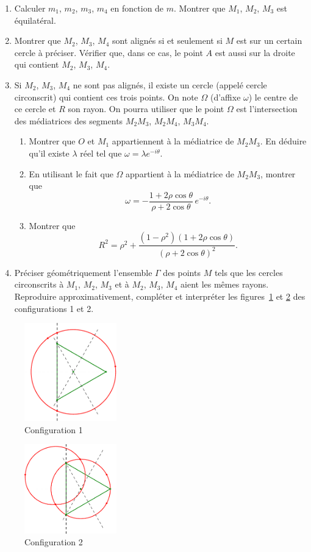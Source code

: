 \begin{enumerate}
 \item Calculer $m_1$, $m_2$, $m_3$, $m_4$ en fonction de $m$. Montrer que $M_1$, $M_2$, $M_3$ est équilatéral.
 \item Montrer que $M_2$, $M_3$, $M_4$ sont alignés si et seulement si $M$ est sur un certain cercle à préciser. Vérifier que, dans ce cas, le point $A$ est aussi sur la droite qui contient $M_2$, $M_3$, $M_4$.
 \item Si $M_2$, $M_3$, $M_4$ ne sont pas alignés, il existe un cercle (appelé cercle circonscrit) qui contient ces trois points.  On note $\Omega$ (d'affixe $\omega$) le centre de ce cercle et $R$ son rayon. On pourra utiliser que le point $\Omega$ est l'intersection des médiatrices des segments $M_2 M_3$, $M_2 M_4$, $M_3 M_4$.
    \begin{enumerate}
     \item Montrer que $O$ et $M_1$ appartiennent à la médiatrice de $M_2 M_3$. En déduire qu'il existe $\lambda$ réel tel que $\omega = \lambda e^{-i \theta}$.
     \item En utilisant le fait que $\Omega$ appartient à la médiatrice de $M_2 M_3$, montrer que
 \[
 \omega = - \frac{1+2\rho \cos \theta}{\rho +2 \cos \theta} \, e^{-i \theta}.
 \]
     \item Montrer que 
\[
  R^2= \rho^2 +\frac{(1-\rho^2)(1+2\rho \cos \theta)}{(\rho + 2 \cos \theta)^2}.
\]
    \end{enumerate}

\item Préciser géométriquement l'ensemble $\Gamma$ des points $M$ tels que les cercles circonscrits à $M_1$, $M_2$, $M_3$ et à $M_2$, $M_3$, $M_4$ aient les mêmes rayons.\newline
Reproduire approximativement, compléter et interpréter les figures~\ref{fig:Ecomp2_3} et \ref{fig:Ecomp2_4} des configurations 1 et 2.
\end{enumerate}

\begin{figure}[ht]
 \centering
 \includegraphics[width=4cm]{Ecomp2_3.pdf}
 \caption{Configuration 1}  \label{fig:Ecomp2_3}
\end{figure}
\begin{figure}[ht]
 \centering
 \includegraphics[width=4cm]{Ecomp2_4.pdf}
  \caption{Configuration 2}\label{fig:Ecomp2_4}
\end{figure}

\clearpage

